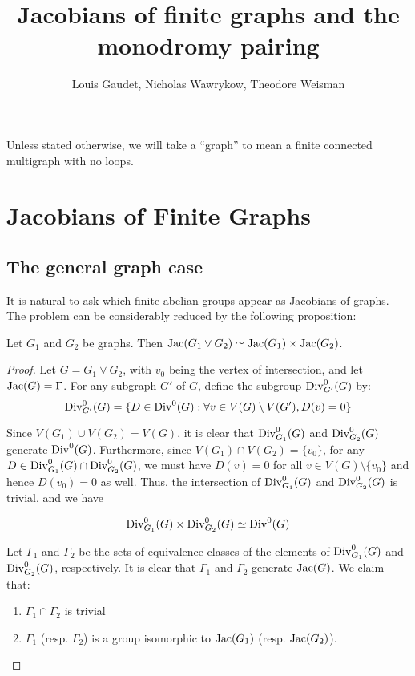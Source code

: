 \documentclass{amsart}
\title{Jacobians of finite graphs and the monodromy pairing}
\author{Louis Gaudet, Nicholas Wawrykow, Theodore Weisman}
\begin{document}
\maketitle

Unless stated otherwise, we will take a ``graph'' to mean a finite
connected multigraph with no loops.

\section{Jacobians of Finite Graphs}
\label{sec:jacobians}

\subsection{The general graph case}
It is natural to ask which finite abelian groups appear as Jacobians
of graphs. The problem can be considerably reduced by the following
proposition:

\begin{prop}
\label{prop:wedge_product}
Let $G_1$ and $G_2$ be graphs. Then $\operatorname{Jac}(G_1 \vee G_2) \simeq
\operatorname{Jac}(G_1) \times \operatorname{Jac}(G_2)$.
\end{prop}
\begin{proof}

  Let $G = G_1 \vee G_2$, with $v_0$ being the vertex of intersection,
  and let $\operatorname{Jac}(G) = \Gamma$. For any subgraph $G'$ of $G$, define the
  subgroup $\operatorname{Div}_{G'}^0(G)$ by:
  \[
  \operatorname{Div}_{G'}^0(G) = \{D \in \operatorname{Div}^0(G) : \forall v \in
  V(G) \setminus V(G'), D(v) = 0 \}
  \]
  
  Since $V(G_1) \cup V(G_2) = V(G)$, it is clear that
  $\operatorname{Div}_{G_1}^0(G)$ and $\operatorname{Div}_{G_2}^0(G)$ generate
  $\operatorname{Div}^0(G)$. Furthermore, since $V(G_1) \cap V(G_2) = \{v_0\}$, for
  any $D \in \operatorname{Div}_{G_1}^0(G) \cap \operatorname{Div}_{G_2}^0(G)$, we must have $D(v)
  = 0$ for all $v \in V(G) \setminus \{v_0\}$ and hence $D(v_0) = 0$
  as well. Thus, the intersection of $\operatorname{Div}_{G_1}^0(G)$ and
  $\operatorname{Div}_{G_2}^0(G)$ is trivial, and we have 

  \[\operatorname{Div}_{G_1}^0(G) \times
  \operatorname{Div}_{G_2}^0(G) \simeq \operatorname{Div}^0(G)\]

  Let $\Gamma_1$ and $\Gamma_2$ be the sets of equivalence classes of
  the elements of $\operatorname{Div}_{G_1}^0(G)$ and $\operatorname{Div}_{G_2}^0(G)$,
  respectively. It is clear that $\Gamma_1$ and $\Gamma_2$ generate
  $\operatorname{Jac}(G)$. We claim that:

  \begin{enumerate}
  \item $\Gamma_1 \cap \Gamma_2$ is trivial
  \item $\Gamma_1$ (resp. $\Gamma_2$) is a group isomorphic to
    $\operatorname{Jac}(G_1)$ (resp. $\operatorname{Jac}(G_2)$). 
  \end{enumerate}
  
\end{proof}
\end{document}
